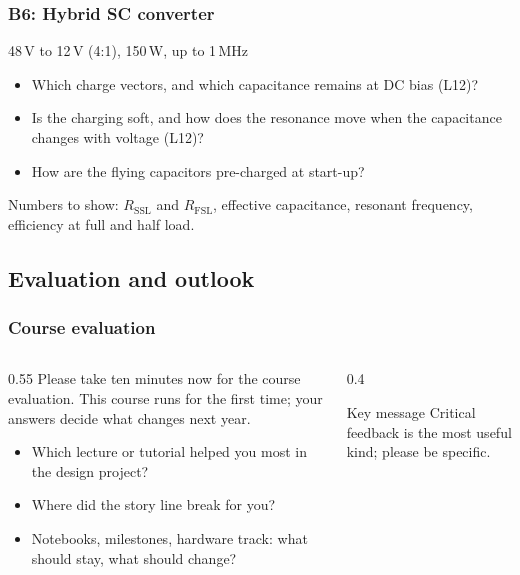 \begin{frame}
	\frametitle{B6: Hybrid SC converter}
	\begin{varblock}[\textwidth]{48\,V to 12\,V (4:1), 150\,W, up to 1\,MHz}
		\begin{itemize}
			\item Which charge vectors, and which capacitance remains at DC bias (L12)?
			\item Is the charging soft, and how does the resonance move when the capacitance changes with voltage (L12)?
			\item How are the flying capacitors pre-charged at start-up?
		\end{itemize}
	\end{varblock}
	\small
	Numbers to show: $R_\mathrm{SSL}$ and $R_\mathrm{FSL}$, effective capacitance, resonant frequency, efficiency at full and half load.
\end{frame}

\subsection{Evaluation and outlook}

\begin{frame}
	\frametitle{Course evaluation}
	\begin{columns}[T]
		\begin{column}{0.55\textwidth}
			Please take ten minutes now for the course evaluation. This course runs for the first time; your answers decide what changes next year.
			\begin{itemize}
				\item Which lecture or tutorial helped you most in the design project?
				\item Where did the story line break for you?
				\item Notebooks, milestones, hardware track: what should stay, what should change?
			\end{itemize}
		\end{column}
		\begin{column}{0.4\textwidth}
			\begin{block}{Key message}
				Critical feedback is the most useful kind; please be specific.
			\end{block}
		\end{column}
	\end{columns}
\end{frame}

